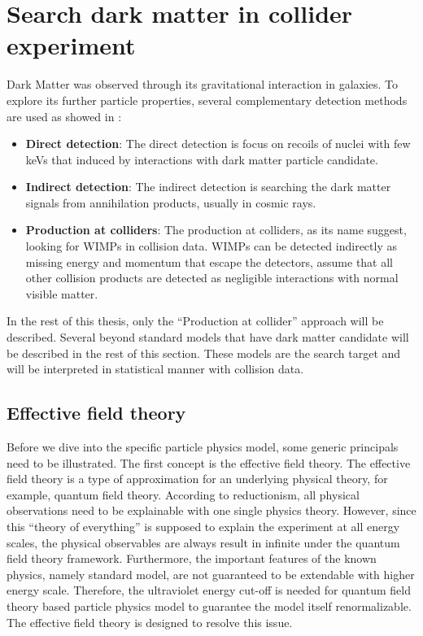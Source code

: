 \section{Search dark matter in collider experiment}
\label{sec:dms3}
\par Dark Matter was observed through its gravitational interaction in galaxies. To explore its further particle properties, several complementary detection methods are used as showed in \cite{Undagoitia:2015gya}: 
\begin{itemize}
  \item \textbf{Direct detection}: The direct detection is focus on recoils of nuclei with few keVs that induced by interactions with dark matter particle candidate.
  \item \textbf{Indirect detection}: The indirect detection is searching the dark matter signals from annihilation products, usually in cosmic rays.
  \item \textbf{Production at colliders}: The production at colliders, as its name suggest, looking for WIMPs in collision data. WIMPs can be detected indirectly as missing energy and momentum that escape the detectors, assume that all other collision products are detected as negligible interactions with normal visible matter.
\end{itemize}

\par In the rest of this thesis, only the ``Production at collider'' approach will be described. Several beyond standard models that have dark matter candidate will be described in the rest of this section. These models are the search target and will be interpreted in statistical manner with collision data.

\subsection{Effective field theory}
Before we dive into the specific particle physics model, some generic principals need to be illustrated. The first concept is the effective field theory. The effective field theory is a type of approximation for an underlying physical theory, for example, quantum field theory. According to reductionism, all physical observations need to be explainable with one single physics theory. However, since this “theory of everything” is supposed to explain the experiment at all energy scales, the physical observables are always result in infinite under the quantum field theory framework. Furthermore, the important features of the known physics, namely standard model, are not guaranteed to be extendable with higher energy scale. Therefore, the ultraviolet energy cut-off is needed for quantum field theory based particle physics model to guarantee the model itself renormalizable. The effective field theory\cite{Pich:1998xt} is designed to resolve this issue.

